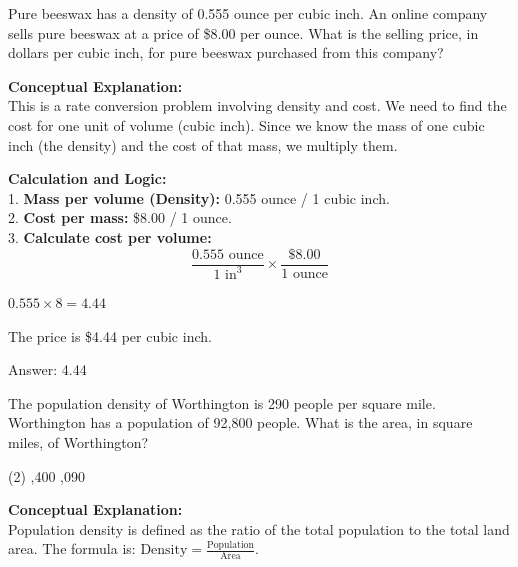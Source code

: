 \documentclass[11pt,paper=a4,answers]{exam}
\begin{document}
\begin{questions}
\vspace{60pt}

\question
Pure beeswax has a density of 0.555 ounce per cubic inch. An online company sells pure beeswax at a price of \$8.00 per ounce. What is the selling price, in dollars per cubic inch, for pure beeswax purchased from this company?

\begin{solution}
\textbf{Conceptual Explanation:} \\
This is a rate conversion problem involving density and cost. We need to find the cost for one unit of volume (cubic inch). Since we know the mass of one cubic inch (the density) and the cost of that mass, we multiply them.

\vspace{30pt}

\textbf{Calculation and Logic:} \\
1. \textbf{Mass per volume (Density):} 0.555 ounce / 1 cubic inch. \\
2. \textbf{Cost per mass:} \$8.00 / 1 ounce. \\
3. \textbf{Calculate cost per volume:}
\[ \frac{0.555 \text{ ounce}}{1 \text{ in}^3} \times \frac{\$8.00}{1 \text{ ounce}} \]

\vspace{15pt}

$0.555 \times 8 = 4.44$

\vspace{10pt}

The price is \$4.44 per cubic inch.

\vspace{30pt}

Answer: \colorbox{yellow!100}{4.44}
\end{solution}

\vspace{60pt}

\question
The population density of Worthington is 290 people per square mile. Worthington has a population of 92,800 people. What is the area, in square miles, of Worthington?
\begin{tasks}(2)
    ,400
    ,090
\end{tasks}

\begin{solution}
\textbf{Conceptual Explanation:} \\
Population density is defined as the ratio of the total population to the total land area. The formula is: $\text{Density} = \frac{\text{Population}}{\text{Area}}$.


\end{solution}
\end{questions}
\end{document}

